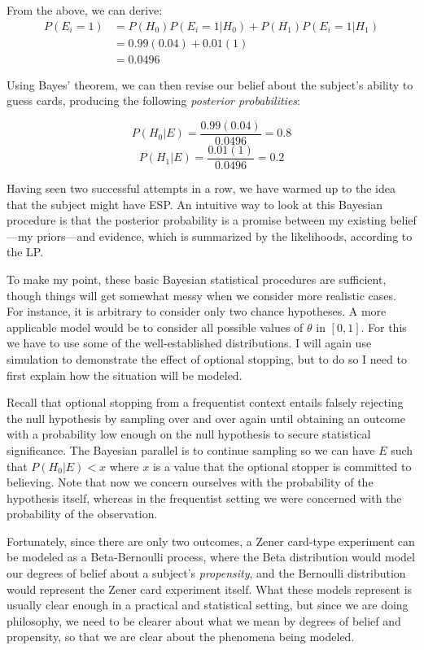 From the above, we can derive:
\begin{align*}
	P(E_i = 1) &= P(H_0)P(E_i=1|H_0) + P(H_1)P(E_i=1|H_1)\\
	& = 0.99(0.04)+0.01(1) \\
	&= 0.0496
\end{align*}



Using Bayes' theorem, we can then revise our belief about the subject's
ability to guess cards, producing the following \emph{posterior
probabilities}:

\[P(H_0|E) = \frac{0.99(0.04)}{0.0496} = 0.8\]
\[P(H_1|E) = \frac{0.01(1)}{0.0496} = 0.2\]

Having seen two successful attempts in a row, we have warmed up to the
idea that the subject might have ESP. An intuitive way to look at this
Bayesian procedure is that the posterior probability is a promise
between my existing belief---my priors---and evidence, which is
summarized by the likelihoods, according to the LP.

To make my point, these basic Bayesian statistical procedures are
sufficient, though things will get somewhat messy when we consider more
realistic cases. For instance, it is arbitrary to consider only two
chance hypotheses. A more applicable model would be to consider all
possible values of \(\theta\) in \([0,1]\). For this we have to use some
of the well-established distributions. I will again use simulation
to demonstrate the effect of optional stopping, but to do so I need to first explain
how the situation will be modeled.

Recall that optional stopping from a frequentist context entails
falsely rejecting the null hypothesis by sampling over and over again until
obtaining an outcome with a probability low enough on the null
hypothesis to secure statistical significance. The Bayesian parallel is
to continue sampling so we can have \(E\) such that \(P(H_0|E) < x\)
where \(x\) is a value that the optional stopper is committed to believing.
Note that now we concern ourselves with the probability of the hypothesis
itself, whereas in the frequentist setting we were concerned with the
probability of the observation.

Fortunately, since there are only two outcomes, a Zener card-type
experiment can be modeled as a Beta-Bernoulli process, where the Beta
distribution would model our degrees of belief about a subject's
\emph{propensity}, and the Bernoulli distribution would represent the
Zener card experiment itself. What these models represent is usually
clear enough in a practical and statistical setting, but since we are doing philosophy, we need to be clearer about what we mean by
degrees of belief and propensity, so that we are clear about the phenomena being
modeled.

